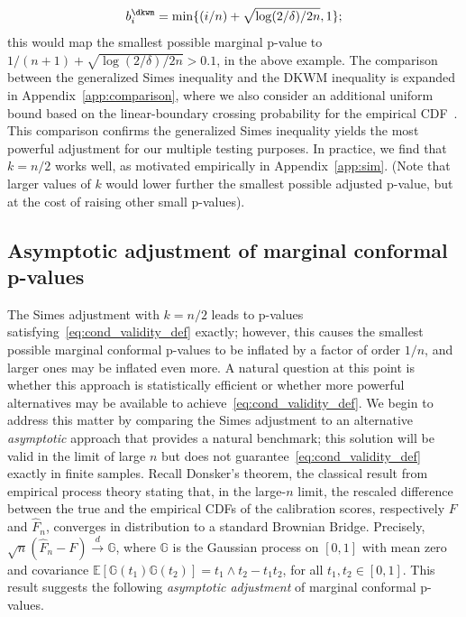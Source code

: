 \begin{equation}\label{eq:bi_dkwm}
b_i^\dkwm = \min\{(i / n) + \sqrt{\log(2 / \delta) / 2n}, 1\};
\end{equation}
this would map the smallest possible marginal p-value to $1 / (n + 1) + \sqrt{\log(2 / \delta) / 2n} > 0.1$, in the above example.
The comparison between the generalized Simes inequality and the DKWM inequality is expanded in Appendix~\ref{app:comparison}, where we also consider an additional uniform bound based on the linear-boundary crossing probability for the empirical CDF~\citep{dempster1959generalized}.
This comparison confirms the generalized Simes inequality yields the most powerful adjustment for our multiple testing purposes.
In practice, we {find that $k = n/2$ works well}, as motivated empirically in Appendix~\ref{app:sim}.
(Note that larger values of $k$ would lower further the smallest possible adjusted p-value, but at the cost of raising other small p-values).

\subsection{Asymptotic adjustment of marginal conformal p-values} \label{sec:gen-asymptotic}

The Simes adjustment with $k=n/2$ leads to p-values satisfying~\eqref{eq:cond_validity_def} exactly; however, this causes the smallest possible marginal conformal p-values to be inflated by a factor of order $1/n$, and larger ones may be inflated even more.
A natural question at this point is whether this approach is statistically efficient or whether more powerful alternatives may be available to achieve~\eqref{eq:cond_validity_def}.
We begin to address this matter by comparing the Simes adjustment to an alternative {\it asymptotic} approach that provides a natural benchmark; this solution will be valid in the limit of large $n$ but does not guarantee~\eqref{eq:cond_validity_def} exactly in finite samples.
Recall Donsker's theorem, the classical result from empirical process theory stating that, in the large-$n$ limit, the rescaled difference between the true and the empirical CDFs of the calibration scores, respectively $F$ and $\hat{F}_n$, converges in distribution to a standard Brownian Bridge. Precisely,
$\sqrt{n} (\hat{F}_n - F) \overset{d}{\rightarrow} \mathbb{G}$,
where $\mathbb{G}$ is the Gaussian process on $[0,1]$ with
mean zero and covariance $\mathbb{E}[\mathbb{G}(t_1)\mathbb{G}(t_2)] = t_1 \wedge t_2 - t_1 t_2$, for all $t_1, t_2 \in [0,1]$.
This result suggests the following {\em asymptotic adjustment} of marginal conformal p-values.

